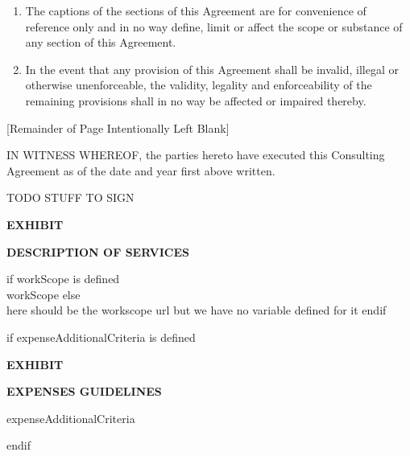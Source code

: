 \documentclass[12pt]{article}
\newcommand{\VAR}[1]{{\color{blue}#1}}
\newcommand{\BLOCK}[1]{{\smallskip \color{red}#1 \\ }}
\begin{document}
\begin{enumerate}
\begin{enumerate}
        \item The captions of the sections of this Agreement are for convenience of reference only and in no way define, limit or affect the scope or substance of any section of this Agreement.
        \item In the event that any provision of this Agreement shall be invalid, illegal or otherwise unenforceable, the validity, legality and enforceability of the remaining provisions shall in no way be affected or impaired thereby.
    \end{enumerate}
\end{enumerate}
\begin{center}
[Remainder of Page Intentionally Left Blank]
\end{center}
\newpage

IN WITNESS WHEREOF, the parties hereto have executed this Consulting Agreement as of the date and year first above written.

TODO STUFF TO SIGN
\newpage
\renewcommand{\theexhibit}{\Alph{exhibit}}
\setcounter{exhibit}{0}

\begin{center}
\label{exhibitA}
\vspace{1.5cm}
{\huge\bfseries EXHIBIT  \par}
\vspace{1cm}
{\huge\bfseries \uppercase{Description of Services} \par}
\end{center}
\BLOCK{ if workScope is defined }
    workScope
\BLOCK{ else }
    here should be the workscope url but we have no variable defined for it
\BLOCK{endif}
\newpage

\BLOCK{if expenseAdditionalCriteria is defined}
\begin{center}
\label{exhibitB}
\vspace{1.5cm}
{\huge\bfseries EXHIBIT  \par}
\vspace{1cm}
{\huge\bfseries \uppercase{Expenses Guidelines} \par}
\end{center}
\VAR{expenseAdditionalCriteria}
\newpage



\BLOCK{endif}
\end{document}
